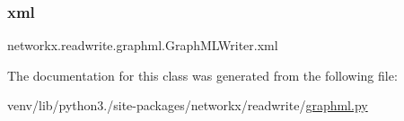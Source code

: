 \mbox{\label{classnetworkx_1_1readwrite_1_1graphml_1_1GraphMLWriter_a0ba337a339a5f55fbc894ae811302af0}} 
\subsubsection{\texorpdfstring{xml}{xml}}
{\footnotesize\ttfamily networkx.\+readwrite.\+graphml.\+Graph\+M\+L\+Writer.\+xml}



The documentation for this class was generated from the following file\+:\begin{DoxyCompactItemize}
\item 
venv/lib/python3./site-\/packages/networkx/readwrite/\hyperlink{graphml_8py}{graphml.\+py}\end{DoxyCompactItemize}
